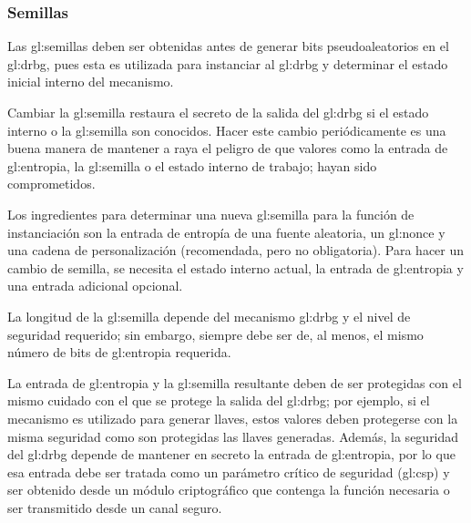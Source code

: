 %
%
\subsubsection{Semillas}

Las \glspl{gl:semilla} deben ser obtenidas antes de generar bits
pseudoaleatorios en el \gls{gl:drbg}, pues esta es utilizada para instanciar al
\gls{gl:drbg} y determinar el estado inicial interno del mecanismo.

Cambiar la \gls{gl:semilla} restaura el secreto de la salida del \gls{gl:drbg}
si el estado interno o la \gls{gl:semilla} son conocidos. Hacer este cambio
periódicamente es una buena manera de mantener a raya el peligro de que valores
como la entrada de \gls{gl:entropia}, la \gls{gl:semilla} o el estado interno
de trabajo; hayan sido comprometidos.

Los ingredientes para determinar una nueva \gls{gl:semilla} para la función de
instanciación son la entrada de entropía de una fuente aleatoria, un
\gls{gl:nonce} y una cadena de personalización (recomendada, pero no
obligatoria). Para hacer un cambio de semilla, se necesita el estado interno
actual, la entrada de \gls{gl:entropia} y una entrada adicional opcional.

La longitud de la \gls{gl:semilla} depende del mecanismo \gls{gl:drbg} y el
nivel de seguridad requerido; sin embargo, siempre debe ser de, al menos, el
mismo número de bits de \gls{gl:entropia} requerida.

La entrada de \gls{gl:entropia} y la \gls{gl:semilla} resultante deben de ser
protegidas con el mismo cuidado con el que se protege la salida del
\gls{gl:drbg}; por ejemplo, si el mecanismo es utilizado para generar llaves,
estos valores deben protegerse con la misma seguridad como son protegidas las
llaves generadas. Además, la seguridad del \gls{gl:drbg} depende de mantener
en secreto la entrada de \gls{gl:entropia}, por lo que esa entrada debe ser
tratada como un parámetro crítico de seguridad (\gls{gl:csp}) y ser obtenido
desde un módulo criptográfico que contenga la función necesaria o ser
transmitido desde un canal seguro.

